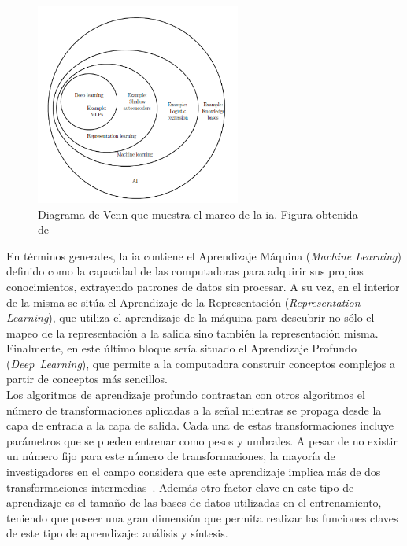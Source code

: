 \begin{figure}[H]
	\begin{center}
		\includegraphics[width=0.6\textwidth]{figures/aprendizaje}
		\caption{Diagrama de Venn que muestra el marco de la \acrshort{ia}. Figura obtenida de~\cite{Goodfellow-et-al-2016}}
		\label{fig.aprendizaje}
	\end{center}
\end{figure}

En términos generales, la \acrshort{ia} contiene el Aprendizaje Máquina (\textit{Machine Learning}) definido como la capacidad de las computadoras para adquirir sus propios conocimientos, extrayendo patrones de datos sin procesar. A su vez, en el interior de la misma se sitúa el Aprendizaje de la Representación (\textit{Representation Learning}), que utiliza el aprendizaje de la máquina para descubrir no sólo el mapeo de la representación a la salida sino también la representación misma. Finalmente, en este último bloque sería situado el Aprendizaje Profundo (\textit{Deep~Learning}), que permite a la computadora construir conceptos complejos a partir de conceptos más sencillos.\\

Los algoritmos de aprendizaje profundo contrastan con otros algoritmos el número de transformaciones aplicadas a la señal mientras se propaga desde la capa de entrada a la capa de salida. Cada una de estas transformaciones incluye parámetros que se pueden entrenar como pesos y umbrales. A pesar de no existir un número fijo para este número de transformaciones, la mayoría de investigadores en el campo considera que este aprendizaje implica más de dos transformaciones intermedias~\cite{2014arXiv1404.7828S}. Además otro factor clave en este tipo de aprendizaje es el tamaño de las bases de datos utilizadas en el entrenamiento, teniendo que poseer una gran dimensión que permita realizar las funciones claves de este tipo de aprendizaje: análisis y síntesis.\\

